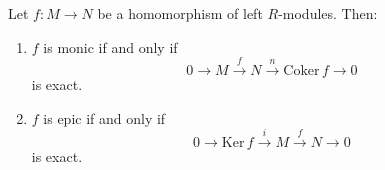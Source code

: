 Let $f: M \to N$ be a homomorphism of left $R$-modules. Then:
\begin{enumerate}
  \item $f$ is monic if and only if
  $$0 \to M \xrightarrow{f} N \xrightarrow{n} \text{Coker}\, f \to 0$$
  is exact.
  \item $f$ is epic if and only if
  $$0 \to \text{Ker}\, f \xrightarrow{i} M \xrightarrow{f} N \to 0$$
  is exact.
\end{enumerate}
